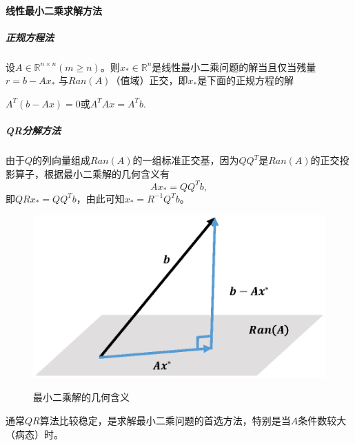\documentclass[UTF8]{article}
\begin{document}
\begin{flushleft}
\paragraph{\textcolor[rgb]{0.00,0.07,1.00}{线性最小二乘求解方法}}
\subparagraph{正规方程法}
设$A\in\mathbb{R}^{n \times n}(m \geq n)$。则$x_*\in\mathbb{R}^n$是线性最小二乘问题的解当且仅当残量$r=b-Ax_*$ 与$Ran(A)$（值域）正交，即$x_*$是下面的\textcolor[rgb]{0.00,0.07,1.00}{正规方程}的解
\begin{center}
$A^T(b-Ax)=0$或$A^TAx=A^Tb.$
\end{center}
\subparagraph{QR分解方法}
由于$Q$的列向量组成$Ran(A)$的一组标准正交基，因为$QQ^T$是$Ran(A)$的正交投影算子，根据最小二乘解的几何含义有
$$Ax_*=QQ^Tb,$$
即$QRx_*=QQ^Tb$，由此可知$x_*=R^{-1}Q^{T}b$。
\begin{figure}[!hbt]
  \centering
  \includegraphics[width=13cm]{images/LSM.eps}\\
  \caption{最小二乘解的几何含义}\label{fig:LSM}
\end{figure}

通常$QR$算法比较稳定，是求解最小二乘问题的首选方法，特别是当$A$条件数较大（病态）时。


\end{flushleft}
\end{document}
